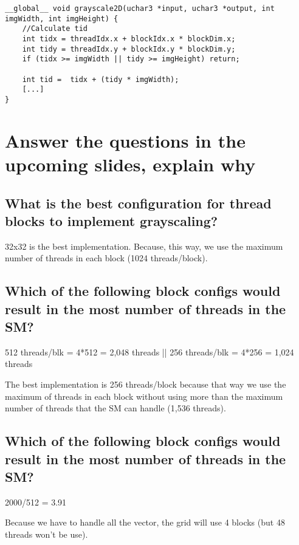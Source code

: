 \documentclass[11pt]{article} %
\begin{document}
\begin{lstlisting}[style=CStyle]
__global__ void grayscale2D(uchar3 *input, uchar3 *output, int imgWidth, int imgHeight) {
    //Calculate tid
    int tidx = threadIdx.x + blockIdx.x * blockDim.x;
    int tidy = threadIdx.y + blockIdx.y * blockDim.y;
    if (tidx >= imgWidth || tidy >= imgHeight) return;

    int tid =  tidx + (tidy * imgWidth);
    [...]
}
\end{lstlisting}

%
%

\section{Answer the questions in the upcoming slides, explain why}

\subsection{What is the best configuration for thread blocks to implement grayscaling?}

32x32 is the best implementation. Because, this way, we use the maximum number of threads in each block (1024 threads/block).

\subsection{Which of the following block configs would result in the most number of threads in the SM?}

512 threads/blk = 4*512 = 2,048 threads || 256 threads/blk = 4*256 = 1,024 threads

The best implementation is 256 threads/block because that way we use the maximum of threads in each block without using more than the maximum number of threads that the SM can handle (1,536 threads).

\subsection{Which of the following block configs would result in the most number of threads in the SM?}

2000/512 = 3.91

Because we have to handle all the vector, the grid will use 4 blocks (but 48 threads won't be use).
\end{document}
